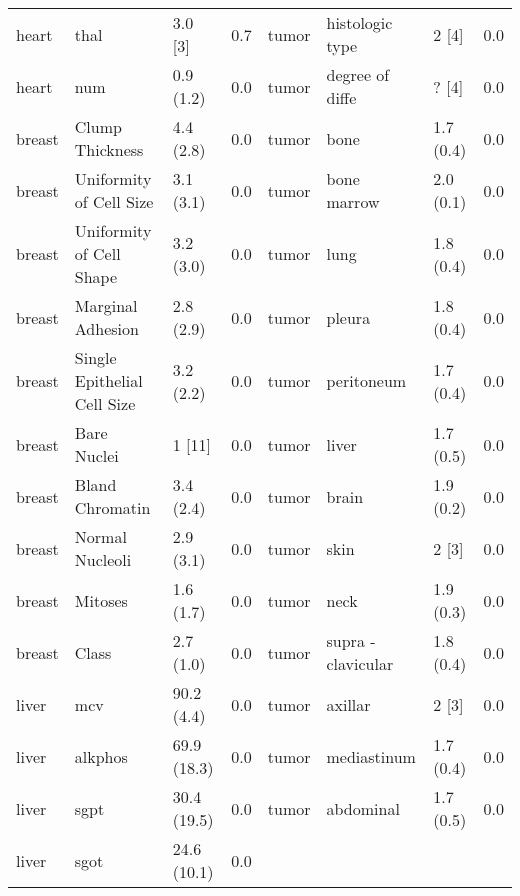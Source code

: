 \begin{small}
\begin{table}[]
\begin{tabularx}{\textwidth}{lXlllXll}
            heart   & thal                           & 3.0 {[}3{]}  & 0.7      & tumor   & histologic type & 2 {[}4{]}    & 0.0      \\
            heart   & num                            & 0.9 (1.2)    & 0.0      & tumor   & degree of diffe & ? {[}4{]}    & 0.0      \\
            breast  & Clump Thickness               & 4.4 (2.8)    & 0.0      & tumor   & bone            & 1.7 (0.4)    & 0.0      \\
            breast  & Uniformity of Cell Size     & 3.1 (3.1)    & 0.0      & tumor   & bone marrow     & 2.0 (0.1)    & 0.0      \\
            breast  & Uniformity of Cell Shape    & 3.2 (3.0)    & 0.0      & tumor   & lung            & 1.8 (0.4)    & 0.0      \\
            breast  & Marginal Adhesion             & 2.8 (2.9)    & 0.0      & tumor   & pleura          & 1.8 (0.4)    & 0.0      \\
            breast  & Single Epithelial Cell Size & 3.2 (2.2)    & 0.0      & tumor   & peritoneum      & 1.7 (0.4)    & 0.0      \\
            breast  & Bare Nuclei                   & 1 {[}11{]}   & 0.0      & tumor   & liver           & 1.7 (0.5)    & 0.0      \\
            breast  & Bland Chromatin               & 3.4 (2.4)    & 0.0      & tumor   & brain           & 1.9 (0.2)    & 0.0      \\
            breast  & Normal Nucleoli               & 2.9 (3.1)    & 0.0      & tumor   & skin            & 2 {[}3{]}    & 0.0      \\
            breast  & Mitoses                        & 1.6 (1.7)    & 0.0      & tumor   & neck            & 1.9 (0.3)    & 0.0      \\
            breast  & Class                          & 2.7 (1.0)    & 0.0      & tumor   & supra -clavicular & 1.8 (0.4)    & 0.0      \\
            liver   & mcv                            & 90.2 (4.4)   & 0.0      & tumor   & axillar         & 2 {[}3{]}    & 0.0      \\
            liver   & alkphos                        & 69.9 (18.3)  & 0.0      & tumor   & mediastinum     & 1.7 (0.4)    & 0.0      \\
            liver   & sgpt                           & 30.4 (19.5)  & 0.0      & tumor   & abdominal       & 1.7 (0.5)    & 0.0      \\
            liver   & sgot                           & 24.6 (10.1)  & 0.0      &   {}      &   {}              &     {}         &    {}      \\
              \bottomrule
            \end{tabularx}
            
        \end{table}
    \end{small}
